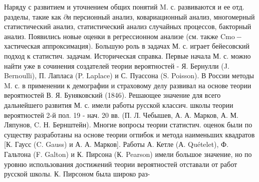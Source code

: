 \documentclass[10pt]{article}
\begin{document}
Наряду с развитием и уточнением общих понятий M. с. развиваются и ее отд. разделы, такие как $\partial и$ персионный анализ, ковариационный анализ, многомерный статистический анализ, статистический анализ случайных процессов, бакторный анализ. Появились новые оценки в регрессионном анализе (см. также $\mathrm{Cmo-}$ хастическая аппроксимация). Большую роль в задачах М. с. играет бейесовский подход к статистич. задачам. Историческая справка. Первые начала М. с. можно найти уже в сочинения создателей теории вероятностей - Я. Бернулли (J. Bernoulli), П. Лапласа (P. Laplace) и С. Пуассона (S. Poisson). В России методы M. с. в применении к демографии и страховому делу развивал на основе теории вероятностей В. Я. Буняковский (1846). Решающее значение для всего дальнейшего развития М. с. имели работы русской классич. школы теории вероятностей 2-й пол. 19 - нач. 20 вв. (П. Л. Чебышев, А. А. Марков, А. М. Ляпунов, C. Н. Бернштейн). Многие вопросы теории статистич. оценок были по существу разработаны на основе теории огпибок и метода наименьших квадратов [К. Гаусс (C. Gauss) и А. А. Марков]. Работы А. Кетле (А. Quételet), Ф. Гальтона (F. Galton) и К. Пирсона (К. Pearson) имели большое значение, но по уровню использования достижений теории вероятностей отставали от работ русской школы. К. Пирсоном была широко раз-
\end{document}
